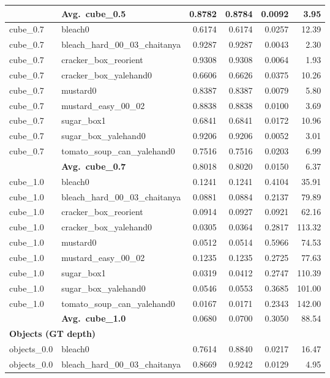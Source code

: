 \begin{longtable}{llrrrr}
  & \textbf{Avg.~cube_0.5} & 0.8782 & 0.8784 & 0.0092 & 3.95 \\
  \midrule
  cube_0.7 & bleach0 & 0.6174 & 0.6174 & 0.0257 & 12.39 \\
  cube_0.7 & bleach\_hard\_00\_03\_chaitanya & 0.9287 & 0.9287 & 0.0043 & 2.30 \\
  cube_0.7 & cracker\_box\_reorient & 0.9308 & 0.9308 & 0.0064 & 1.93 \\
  cube_0.7 & cracker\_box\_yalehand0 & 0.6606 & 0.6626 & 0.0375 & 10.26 \\
  cube_0.7 & mustard0 & 0.8387 & 0.8387 & 0.0079 & 5.80 \\
  cube_0.7 & mustard\_easy\_00\_02 & 0.8838 & 0.8838 & 0.0100 & 3.69 \\
  cube_0.7 & sugar\_box1 & 0.6841 & 0.6841 & 0.0172 & 10.96 \\
  cube_0.7 & sugar\_box\_yalehand0 & 0.9206 & 0.9206 & 0.0052 & 3.01 \\
  cube_0.7 & tomato\_soup\_can\_yalehand0 & 0.7516 & 0.7516 & 0.0203 & 6.99 \\
  \cmidrule{2-6}
  & \textbf{Avg.~cube_0.7} & 0.8018 & 0.8020 & 0.0150 & 6.37 \\
  \midrule
  cube_1.0 & bleach0 & 0.1241 & 0.1241 & 0.4104 & 35.91 \\
  cube_1.0 & bleach\_hard\_00\_03\_chaitanya & 0.0881 & 0.0884 & 0.2137 & 79.89 \\
  cube_1.0 & cracker\_box\_reorient & 0.0914 & 0.0927 & 0.0921 & 62.16 \\
  cube_1.0 & cracker\_box\_yalehand0 & 0.0305 & 0.0364 & 0.2817 & 113.32 \\
  cube_1.0 & mustard0 & 0.0512 & 0.0514 & 0.5966 & 74.53 \\
  cube_1.0 & mustard\_easy\_00\_02 & 0.1235 & 0.1235 & 0.2725 & 77.63 \\
  cube_1.0 & sugar\_box1 & 0.0319 & 0.0412 & 0.2747 & 110.39 \\
  cube_1.0 & sugar\_box\_yalehand0 & 0.0546 & 0.0553 & 0.3685 & 101.00 \\
  cube_1.0 & tomato\_soup\_can\_yalehand0 & 0.0167 & 0.0171 & 0.2343 & 142.00 \\
  \cmidrule{2-6}
  & \textbf{Avg.~cube_1.0} & 0.0680 & 0.0700 & 0.3050 & 88.54 \\
  \midrule
\multicolumn{6}{l}{\textbf{Objects (GT depth)}} \\
\midrule
  objects_0.0 & bleach0 & 0.7614 & 0.8840 & 0.0217 & 16.47 \\
  objects_0.0 & bleach\_hard\_00\_03\_chaitanya & 0.8669 & 0.9242 & 0.0129 & 4.95 \\

\end{longtable}
